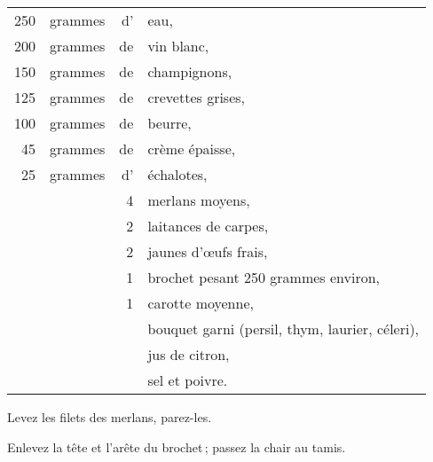 \footnotesize
\begin{longtable}{rrrp{16em}}
    250 & grammes & d' & eau,                                                                             \\
    200 & grammes & de & vin blanc,                                                                       \\
    150 & grammes & de & champignons,                                                                     \\
    125 & grammes & de & crevettes grises,                                                                \\
    100 & grammes & de & beurre,                                                                          \\
     45 & grammes & de & crème épaisse,                                                                   \\
     25 & grammes & d' & échalotes,                                                                       \\
        &         &  4 & merlans moyens,                                                                  \\
        &         &  2 & laitances de carpes,                                                             \\
        &         &  2 & jaunes d'œufs frais,                                                             \\
        &         &  1 & brochet pesant 250 grammes environ,                                              \\
        &         &  1 & carotte moyenne,                                                                 \\
        &         &    & bouquet garni (persil, thym, laurier, céleri),                                   \\
        &         &    & jus de citron,                                                                   \\
        &         &    & sel et poivre.                                                                   \\
\end{longtable}
\normalsize

Levez les filets des merlans, parez-les.

Enlevez la tête et l'arête du brochet ; passez la chair au tamis.

